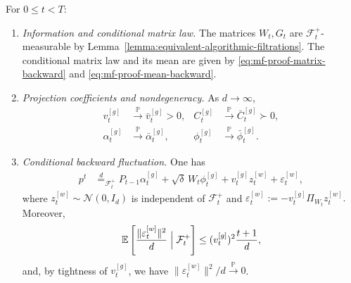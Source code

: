 \begin{proposition}
\begin{description}[wide]
    \item[$(\mathsf B_t)$ Backward half-step:]
    For $0\leq t<T$:
    \begin{enumerate}[label=(\roman*),wide]
        \item \emph{Information and conditional matrix law.}
        The matrices $W_t,G_t$ are $\mathcal F_t^+$-measurable by
        Lemma~\ref{lemma:equivalent-algorithmic-filtrations}.
        The conditional matrix law and its mean are given by
        \eqref{eq:mf-proof-matrix-backward}
        and \eqref{eq:mf-proof-mean-backward}.

        \item \emph{Projection coefficients and nondegeneracy.}
        As $d\to\infty$,
        \begin{align}
            v_t^{[g]}
            &\xrightarrow{\mathbb P}\bar v_t^{[g]}>0,
            &
            C_t^{[g]}
            &\xrightarrow{\mathbb P}\bar C_t^{[g]}\succ0,
            \label{eq:master-residual-nondegeneracy}
            \\
            \alpha_t^{[g]}
            &\xrightarrow{\mathbb P}\bar\alpha_t^{[g]},
            &
            \phi_t^{[g]}
            &\xrightarrow{\mathbb P}\bar\phi_t^{[g]}.
            \label{eq:master-backward-coefficient-convergence}
        \end{align}

        \item \emph{Conditional backward fluctuation.}
        One has
        \begin{align}
            p^t
            &\stackrel d=_{\mathcal F_t^+}
            P_{t-1}\alpha_t^{[g]}
            +\sqrt\delta\,W_t\phi_t^{[g]}
            +v_t^{[g]}z_t^{[w]}
            +\varepsilon_t^{[w]},
            \label{eq:conditional-p-decomposition-lemmas}
        \end{align}
        where $z_t^{[w]}\sim\mathcal N(0,I_d)$ is independent
        of $\mathcal F_t^+$ and
        \(
            \varepsilon_t^{[w]}
            :=
            -v_t^{[g]}\Pi_{W_t}z_t^{[w]}.
        \)
        Moreover,
        \begin{equation}
            \mathbb E\left[
                \frac{\|\varepsilon_t^{[w]}\|^2}{d}
                \Bigm|\mathcal F_t^+
            \right]
            \leq
            (v_t^{[g]})^2\frac{t+1}{d},
            \label{eq:backward-projection-error-lemmas}
        \end{equation}
        and, by tightness of $v_t^{[g]}$, we have
        \(
            \|\varepsilon_t^{[w]}\|^2 / d
            \xrightarrow{\mathbb P}0
        \).


\end{enumerate}
\end{description}
\end{proposition}
